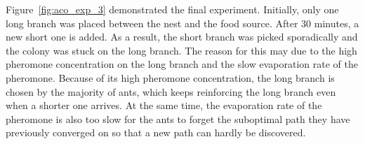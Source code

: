 Figure~\ref{fig:aco_exp_3} demonstrated the final experiment. Initially, only one long branch was placed between the nest and the food source. After 30 minutes, a new short one is added. As a result, the short branch was picked sporadically and the colony was stuck on the long branch. The reason for this may due to the high pheromone concentration on the long branch and the slow evaporation rate of the pheromone. Because of its high pheromone concentration, the long branch is chosen by the majority of ants, which keeps reinforcing the long branch even when a shorter one arrives. At the same time, the evaporation rate of the pheromone is also too slow for the ants to forget the suboptimal path they have previously converged on so that a new path can hardly be discovered.

\setlength{\intextsep}{4pt}
\renewcommand{\scalefigure}{0.5}
